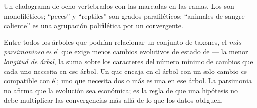 \begin{omfigure}
{\small Un cladograma de ocho vertebrados con las  marcadas en
las ramas. Los  son monofiléticos; ``peces'' y ``reptiles'' son grados
parafiléticos; ``animales de sangre caliente'' es una agrupación
polifilética por un  convergente.}
\end{omfigure}

\begin{definition}[Parsimonia]\label{def:b1:classifying-biodiversity:parsimony}
Entre todos los árboles que podrían relacionar un conjunto de taxones, el
\emph{más parsimonioso} es el que exige menos cambios evolutivos de estado
de  --- la menor \emph{longitud de árbol}, la suma sobre los
caracteres del número mínimo de cambios que cada uno necesita en ese árbol.
Un  que encaja en el árbol con un solo cambio es compatible con él;
uno que necesita dos o más es una  en ese árbol. La parsimonia no
afirma que la evolución sea económica; es la regla de que una hipótesis no
debe multiplicar las convergencias más allá de lo que los datos obliguen.
\end{definition}

